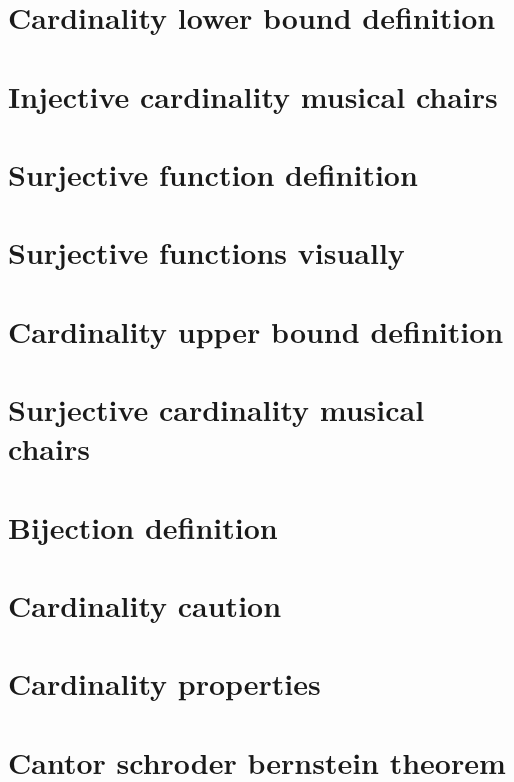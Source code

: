\section*{Cardinality lower bound definition}

\vfill
\section*{Injective cardinality musical chairs}

\vfill
\section*{Surjective function definition}

\vfill
\section*{Surjective functions visually}

\vfill
\section*{Cardinality upper bound definition}

\vfill
\section*{Surjective cardinality musical chairs}

\vfill
\section*{Bijection definition}

\vfill
\section*{Cardinality caution}

\vfill
\section*{Cardinality properties}

\vfill
\section*{Cantor schroder bernstein theorem}

\vfill
